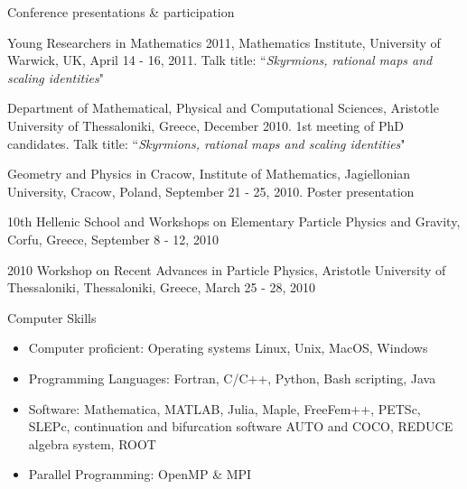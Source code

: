 \documentclass[10pt]{article} %
\newenvironment{outerlist}[1][\enskip\textbullet]%
        {\begin{itemize}[#1]}{\end{itemize}%
         \vspace{-.6\baselineskip}}
\begin{document}
\begin{section}{Conference presentations \& participation}
\begin{etaremune}
\item  Young Researchers in Mathematics 2011, Mathematics Institute, University of Warwick, UK, April 14 - 16, 2011.
       Talk title: ``\textit{Skyrmions, rational maps and scaling identities}"
 
\item  Department of Mathematical, Physical and Computational Sciences, Aristotle University of Thessaloniki, Greece, December 2010.
       1st meeting of PhD candidates. Talk title: ``\textit{Skyrmions, rational maps and scaling identities}"
  
\item  Geometry and Physics in Cracow, Institute of Mathematics, Jagiellonian University, Cracow, Poland, 
       September 21 - 25, 2010. Poster presentation
        
\item   10th Hellenic  School and Workshops on Elementary Particle Physics and Gravity, Corfu, Greece, September 8 - 12, 2010                
        
\item   2010 Workshop on Recent Advances in Particle Physics, Aristotle University of Thessaloniki, Thessaloniki, 
        Greece, March 25 - 28, 2010  
  
\end{etaremune}

\end{section}

\begin{section}{Computer Skills}
\begin{outerlist}

\item \vskip -7mm
Computer proficient:  Operating systems Linux, Unix, MacOS, Windows
\item Programming Languages: Fortran, C/C++, Python, Bash scripting, Java
\item Software: Mathematica, MATLAB, Julia, Maple, FreeFem{\small +$\!$+}, PETSc, SLEPc,
continuation and bifurcation software AUTO and COCO, REDUCE algebra system, ROOT
\item Parallel Programming: OpenMP \& MPI

\end{outerlist}

\end{section}
\end{document}
